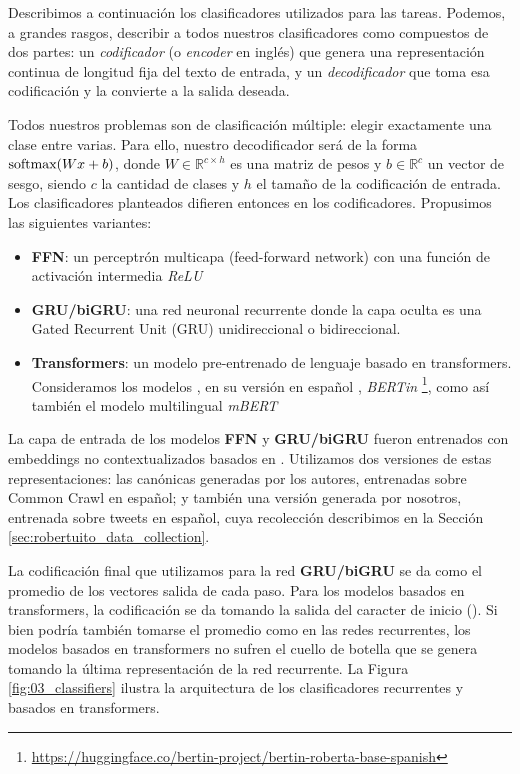 Describimos a continuación los clasificadores utilizados para las tareas. Podemos, a grandes rasgos, describir a todos nuestros clasificadores como compuestos de dos partes: un \emph{codificador} (o \emph{encoder} en inglés) que genera una representación continua de longitud fija del texto de entrada, y un \emph{decodificador} que toma esa codificación y la convierte a la salida deseada.

Todos nuestros problemas son de clasificación múltiple: elegir exactamente una clase entre varias. Para ello, nuestro decodificador será de la forma $\text{softmax}(Wx + b)$, donde $W \in \mathbb{R}^{c \times h}$ es una matriz de pesos y $b \in \mathbb{R}^c$ un vector de sesgo, siendo $c$ la cantidad de clases y $h$ el tamaño de la codificación de entrada. Los clasificadores planteados difieren entonces en los codificadores. Propusimos las siguientes variantes:

\begin{itemize}
    \item \textbf{FFN}: un perceptrón multicapa (feed-forward network) con una función de activación intermedia \emph{ReLU}
    \item \textbf{GRU/biGRU}: una red neuronal recurrente donde la capa oculta es una Gated Recurrent Unit (GRU) unidireccional o bidireccional.
    \item \textbf{Transformers}: un modelo pre-entrenado de lenguaje basado en transformers. Consideramos los modelos \beto{} \cite{canete2020spanish}, \roberta{} en su versión en español \cite{gutierrezfandino2021spanish}, \emph{BERTin} \footnote{\url{https://huggingface.co/bertin-project/bertin-roberta-base-spanish}}, como así también el modelo multilingual \emph{mBERT}
\end{itemize}

La capa de entrada de los modelos \textbf{FFN} y \textbf{GRU/biGRU} fueron entrenados con embeddings no contextualizados basados en \fasttext{}. Utilizamos dos versiones de estas representaciones: las canónicas generadas por los autores, entrenadas sobre Common Crawl en español; y también una versión generada por nosotros, entrenada sobre tweets en español, cuya recolección describimos en la Sección \ref{sec:robertuito_data_collection}.

La codificación final que utilizamos para la red \textbf{GRU/biGRU} se da como el promedio de los vectores salida de cada paso. Para los modelos basados en transformers, la codificación se da tomando la salida del caracter de inicio (\clstok{}). Si bien podría también tomarse el promedio como en las redes recurrentes, los modelos basados en transformers no sufren el cuello de botella que se genera tomando la última representación de la red recurrente. La Figura \ref{fig:03_classifiers} ilustra la arquitectura de los clasificadores recurrentes y basados en transformers.


